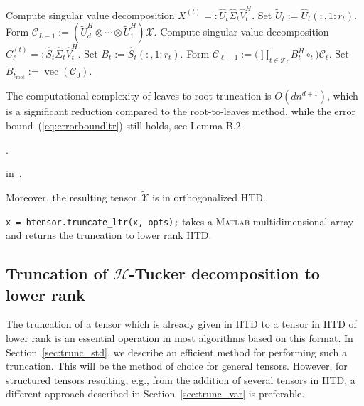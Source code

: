 \documentclass[11pt, a4paper]{article}
\newcommand{\calC}{\mathcal{C}}
\newcommand{\calH}{\mathcal{H}}
\newcommand{\calL}{\mathcal{L}}
\newcommand{\calT}{\mathcal{T}}
\newcommand{\calX}{\mathcal{X}}
\DeclareMathOperator{\vect}{vec}
\renewcommand{\tilde}{\widetilde}
\renewcommand{\hat}{\widehat}
\begin{document}
\begin{preprint}
\begin{algorithm}
\begin{algorithmic}
  \FOR{$t \in \calL(\calT)$}
  \STATE Compute singular value decomposition $X^{(t)} =: \hat{U}_t \hat{\Sigma}_t \hat{V}_t^H$.
  \STATE Set $\tilde{U}_t := \hat{U}_t(:, 1:r_t)$.
  \ENDFOR
  \STATE Form $\calC_{L-1} := (\tilde U_d^H \otimes \cdots \otimes \tilde U_1^H) \calX$.
  \FOR{$\ell = h(\calT)-1, \ldots, 1$}
  \FOR{$t \in \calT_\ell \setminus \calL(\calT)$}
  \STATE Compute singular value decomposition  $C_\ell^{(t)} =: \hat{S}_t \hat{\Sigma}_t \hat{V}_t^H$.
  \STATE Set $B_t := \hat{S}_t(:, 1:r_t)$.
  \ENDFOR
  \STATE Form $\calC_{\ell-1} := \Big( \prod_{t \in \calT_\ell} B_t^H \circ_t \Big) \calC_\ell$.
  \ENDFOR
  \STATE Set $B_{t_\text{root}} := \vect(\calC_0)$.
\end{algorithmic}
\end{algorithm}
\end{preprint}
The computational complexity of leaves-to-root truncation
is $O(d n^{d+1})$, which is a significant reduction
compared to the root-to-leaves method, while the error bound~(\ref{eq:errorboundltr})
still holds, see Lemma B.2%
\begin{preprint}
.
\end{preprint}
\begin{submitted}
{} in~\cite{KreT11tr}.
\end{submitted}
Moreover, the resulting tensor
$\tilde{\calX}$ is in orthogonalized HTD.
% 
\begin{preprint}
\begin{framed} \noindent
\texttt{x = htensor.truncate\_ltr(x, opts);} takes a \textsc{Matlab} multidimensional array and returns the truncation to lower rank HTD.
\end{framed}
\end{preprint}
%
\subsection{Truncation of $\calH$-Tucker decomposition to lower rank} \label{sec:trunc_htucker}
%

The truncation of a tensor which is already given in HTD to a tensor in HTD of lower rank is
an essential operation in most algorithms based on this format.
In Section~\ref{sec:trunc_std}, we
describe an efficient method for performing such a truncation.
This will be the method of choice for general tensors. However, for structured 
tensors resulting, e.g., from the addition of several tensors in HTD,
a different approach described  in Section~\ref{sec:trunc_var} is preferable.
 
\end{document}
